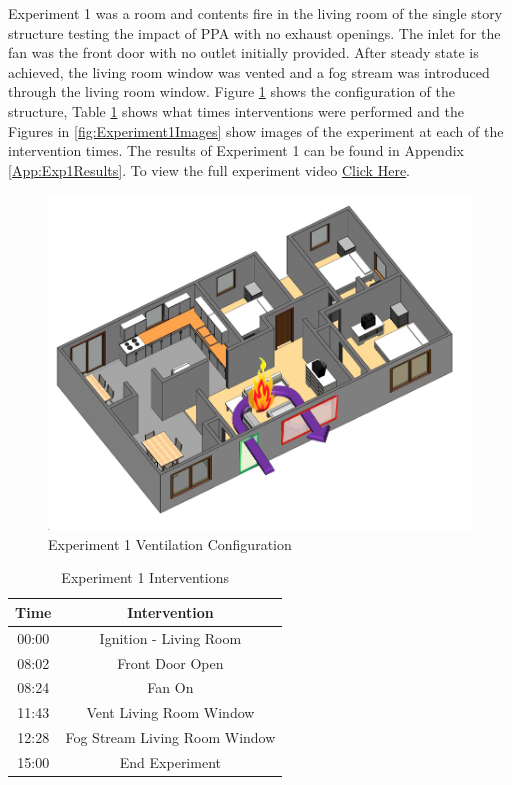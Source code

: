 \documentclass{article}
\begin{document}
Experiment 1 was a room and contents fire in the living room of the single story structure testing the impact of PPA with no exhaust openings. The inlet for the fan was the front door with no outlet initially provided. After steady state is achieved, the living room window was vented and a fog stream was introduced through the living room window. Figure \ref{fig:Exp1VentConfig} shows the configuration of the structure, Table \ref{Table:Exp1Interventions} shows what times interventions were performed and the Figures in \ref{fig:Experiment1Images} show images of the experiment at each of the intervention times. The results of Experiment 1 can be found in Appendix \ref{App:Exp1Results}. To view the full experiment video \href{https://youtu.be/gl8rc1Nsl1k}{Click Here}.

\begin{figure}[H]
	\centering
	\includegraphics[width=5in]{0_Images/FireExperiments/Single_Story/Experiment_1.jpg}
	\caption{Experiment 1 Ventilation Configuration}
	\label{fig:Exp1VentConfig}
\end{figure}

\begin{table}[H]
	\centering
	\caption{Experiment 1 Interventions}
	\begin{tabular}{|c|c|} 
		\hline
		Time & Intervention \\ \hline \hline
		00:00 & Ignition - Living Room \\ \hline
		08:02 & Front Door Open \\ \hline
		08:24 & Fan On \\ \hline
		11:43 & Vent Living Room Window \\ \hline
		12:28 & Fog Stream Living Room Window \\ \hline
		15:00 & End Experiment\\ \hline
	\end{tabular}
	\label{Table:Exp1Interventions}
\end{table}
\end{document}
